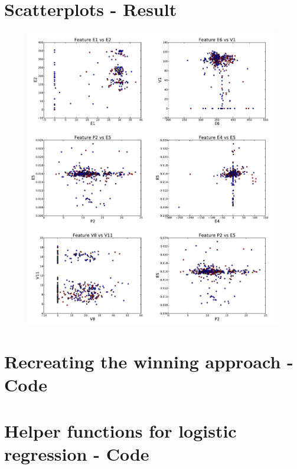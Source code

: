\section{Scatterplots - Result} %
\label{app:result-scatterplots}
\begin{figure}[hb]
    \centering
    \includegraphics[width=.9\textwidth]{media/scatterplots-sheet.pdf}
    \caption{}
\end{figure}

\clearpage

\section{Recreating the winning approach - Code} %
\label{app:source-recreate-winner}

\section{Helper functions for logistic regression - Code} %
\label{app:helper-logistic}

